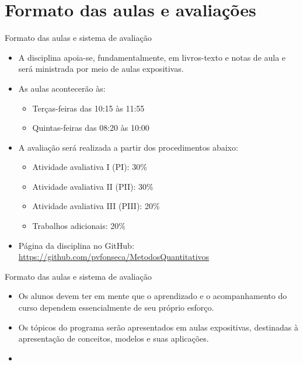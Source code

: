 \documentclass[10pt]{beamer}
\begin{document}
\section{Formato das aulas e avaliações}
\begin{frame}{Formato das aulas e sistema de avaliação}
    \begin{itemize}
        \item A disciplina apoia-se, fundamentalmente, em livros-texto e notas de aula e será ministrada por meio de aulas expositivas.\bigskip

        \item As aulas acontecerão às:
              \begin{itemize}
                  \item Terças-feiras das 10:15 às 11:55
                  \item Quintas-feiras das 08:20 às 10:00\bigskip
              \end{itemize}

        \item A avaliação será realizada a partir dos procedimentos abaixo:
              \begin{itemize}
                  \item Atividade avaliativa I (PI): 30\%
                  \item Atividade avaliativa II (PII): 30\%
                  \item Atividade avaliativa III (PIII): 20\%
                  \item Trabalhos adicionais: 20\%\bigskip
              \end{itemize}

        \item Página da disciplina no GitHub: \href{github.com/pvfonseca/MetodosQuantitativos}{https://github.com/pvfonseca/MetodosQuantitativos}
    \end{itemize}
\end{frame}

\begin{frame}{Formato das aulas e sistema de avaliação}
    \begin{itemize}
        \item Os alunos devem ter em mente que o aprendizado e o acompanhamento do curso dependem essencialmente de seu próprio esforço.\bigskip

        \item Os tópicos do programa serão apresentados em aulas expositivas, destinadas à apresentação de conceitos, modelos e suas aplicações.\bigskip

        \item[\emoji{warning}] 
    \end{itemize}

\end{frame}
\end{document}
